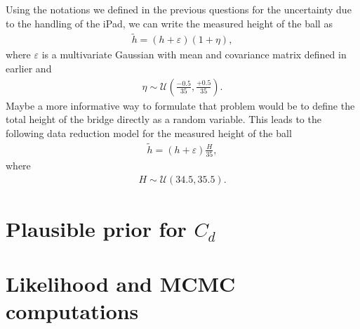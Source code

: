 \documentclass{article}
\begin{document}
\begin{enumerate}
Using the notations we defined in the previous questions for the
       uncertainty due to the handling of the iPad, we can write the
       measured height of the ball as 
\begin{align*}
 \tilde{h} = \left( h + \varepsilon \right) (1 + \eta),
\end{align*}
where $\varepsilon$ is a multivariate Gaussian with mean and covariance
       matrix defined in earlier and  
\begin{align*}
 \eta \sim \mathcal{U}\left( \frac{-0.5}{35}, \frac{+0.5}{35} \right) .
\end{align*}
Maybe a more informative way to formulate that problem would be to
       define the total height of the bridge directly as a random
       variable. This leads to the following data reduction model for
       the measured height of the ball 
\begin{align*}
 \tilde{h} = ( h  + \varepsilon ) \frac{H}{35},
\end{align*}
where
\begin{align*}
 H \sim \mathcal{U} \left( 34.5, 35.5 \right).
\end{align*}
\end{enumerate}

\section{Plausible prior for $C_d$}

\section{Likelihood and MCMC computations}
\end{document}

